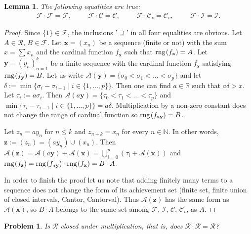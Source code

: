 \documentclass{amsart}
\newtheorem{lemma}[theorem]{Lemma}
\newtheorem{problem}[theorem]{Problem}
\theoremstyle{definition}
\newcommand{\rng}{{\rm rng} \hspace{0.03cm}}
\newcommand{\Cv}{\mathcal{C}_{v}}
\begin{document}
\begin{lemma}\label{dolozskonczony}
The following equalities are true: 
\begin{align*}
\mathcal{F}\cdot \mathcal{F}=\mathcal{F}, \hspace{1cm} \mathcal{F}\cdot \mathcal{C}=\mathcal{C}, \hspace{1cm} \mathcal{F}\cdot \Cv=\Cv, \hspace{1cm} \mathcal{F}\cdot \mathcal{I}=\mathcal{I}.
\end{align*}
\end{lemma}
\begin{proof}
Since $\{1\}\in \mathcal{F}$, the inclusions '$\supseteq$' in all four equalities are obvious. 
Let $A\in \mathcal{R}$, $B\in \mathcal{F}$. 
Let $\textbf{x}=(x_n)$ be a sequence (finite or not) with the sum $x=\sum x_n$ and the cardinal function $f_{\textbf{x}}$ such that $\rng(f_{\textbf{x}})=A$. Let $\textbf{y}=(y_n)_{n=1}^{k}$ be a finite sequence with the cardinal function $f_{\textbf{y}}$ satisfying $\rng(f_{\textbf{y}})=B$. Let us write $\mathcal{A}(\textbf{y})=\{\sigma_0<\sigma_1<\ldots<\sigma_p\}$ and let $\delta:=\min\{\sigma_i-\sigma_{i-1} \mid i\in\{1,\ldots,p\}\}$.  Then one can find $a\in\mathbb{R}$ such that $a\delta > x$. Let $\tau_{i}:=a\sigma_{i}$. Then $\mathcal{A}(a\textbf{y})=\{\tau_0<\tau_1<\ldots<\tau_p\}$ and  $\min\{\tau_i-\tau_{i-1} \mid i\in\{1,\ldots,p\}\}=a\delta$. Multiplication by a non-zero constant does not change the range of cardinal function so $\rng(f_{a\textbf{y}})=B$.

Let $z_n=ay_n$ for $n\leq k$  and $z_{n+k}=x_n$ for every $n\in\mathbb{N}$. In other words, $\textbf{z}:=(z_n)=(ay_n)\cup(x_n)$. Then $\mathcal{A}(\textbf{z})=\mathcal{A}(a\textbf{y})+\mathcal{A}(\textbf{x})=\bigcup_{i=0}^{p} (\tau_i + \mathcal{A}(\textbf{x}))$ and $\rng(f_{\textbf{z}})=\rng(f_{a\textbf{y}})\cdot \rng(f_{\textbf{x}})=B\cdot A$.

In order to finish the proof let us note that adding finitely many terms to a sequence does not change the form of its achievement set (finite set, finite union of closed intervals, Cantor, Cantorval). Thus $\mathcal{A}(\textbf{z})$ has the same form as $\mathcal{A}(\textbf{x})$, so $B\cdot A$ belongs to the same set among $\mathcal{F}$, $\mathcal{I}$, $\mathcal{C}$, $\Cv$, as $A$.
\end{proof}


\begin{problem}
Is $\mathcal{R}$ closed under multiplication, that is, does $\mathcal{R}\cdot \mathcal{R}= \mathcal{R}$?
\end{problem}
\end{document}
